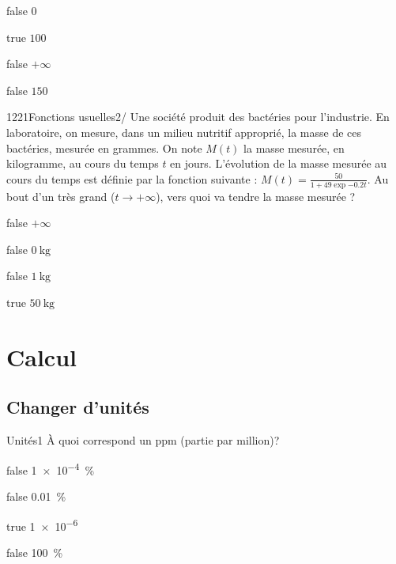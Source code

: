 \documentclass[11pt]{article}
\begin{document}
				\begin{reponses}
            	\item[false]  $0 $ 
            	\item[true]   $100 $ 
                \item[false]   $+\infty $ 
                \item[false]  $150 $ 
                
                \end{reponses}
		
			
        	\begin{question}{1221}{Fonctions usuelles}{2}{/}
				Une société produit des bactéries pour l’industrie. En laboratoire, on mesure, dans un milieu nutritif approprié, la masse de ces bactéries, mesurée en grammes. On note $M(t)$ la masse mesurée, en kilogramme, au cours du temps $t$ en jours. L'évolution de la masse mesurée au cours du temps est définie par la fonction suivante : $M(t) = \frac{50}{1+49\exp{-0.2t}}$. Au bout d'un très grand ($t \to +\infty$), vers quoi va tendre la masse mesurée ?
            \end{question}

            \begin{reponses}
            	\item[false] $+\infty$
            	\item[false] $\SI{0}{\kilo\gram}$
                \item[false] $\SI{1}{\kilo\gram}$
                \item[true] $\SI{50}{\kilo\gram}$
            \end{reponses}

    \section{Calcul}
    
        \subsection{Changer d'unités}
        
            \begin{question}{}{Unités}{1}{}
                À quoi correspond un \si{ppm} (partie par million)?
            \end{question}
                
            \begin{reponses} 
                \item[false] \SI{1e-4}{\percent}
                \item[false] \SI{0.01}{\percent}
                \item[true] \num{1e-6}
        	    \item[false] \SI{100}{\percent}
            \end{reponses}
            
\end{document}

